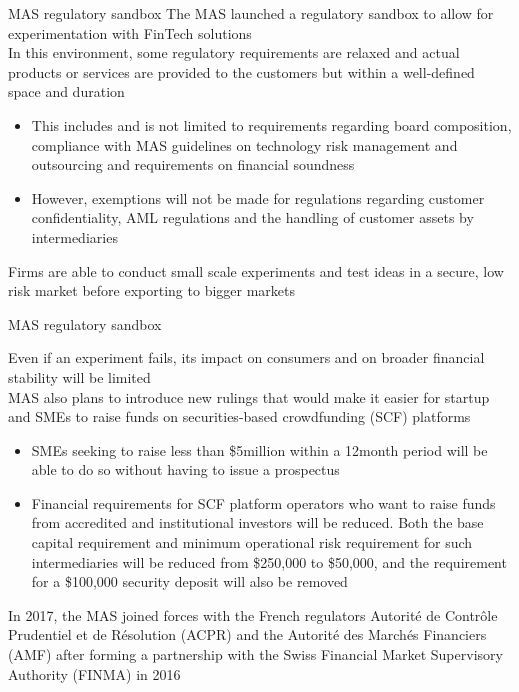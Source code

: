 \documentclass[10pt]{beamer}
\begin{document}

\begin{frame}{MAS regulatory sandbox}
	The MAS launched a regulatory sandbox to allow for experimentation with FinTech solutions \\ \vspace{3mm}
	In this environment, some regulatory requirements are relaxed and actual products or services are provided to the customers but within a well-defined space and duration
	\begin{itemize}
		\item This includes and is not limited to requirements regarding board composition, compliance with MAS guidelines on technology risk management and outsourcing and requirements on financial soundness
		\item However, exemptions will not be made for regulations regarding customer confidentiality, AML regulations and the handling of customer assets by intermediaries
	\end{itemize}
	Firms are able to conduct small scale experiments and test ideas in a secure, low risk market before exporting to bigger markets
\end{frame}


\begin{frame}{MAS regulatory sandbox}
	\begin{small}
		Even if an experiment fails, its impact on consumers and on broader financial stability will be limited\\ \vspace{3mm}
		MAS also plans to introduce new rulings that would make it easier for startup and SMEs to raise funds on securities-based crowdfunding (SCF) platforms
		\begin{itemize}
			\item SMEs seeking to raise less than \$5million within a 12month period will be able to do so without having to issue a prospectus
			\item Financial requirements for SCF platform operators who want to raise funds from accredited and institutional investors will be reduced. Both the base capital requirement and minimum operational risk requirement for such intermediaries will be reduced from \$250,000 to \$50,000, and the requirement for a \$100,000 security deposit will also be removed
		\end{itemize}
		In 2017, the MAS joined forces with the French regulators Autorit\'{e} de Contr\^{o}le Prudentiel et de R\'{e}solution (ACPR) and the Autorit\'{e} des March\'{e}s Financiers (AMF) after forming a partnership with the Swiss Financial Market Supervisory Authority (FINMA) in 2016
	\end{small}
\end{frame}
\end{document}
